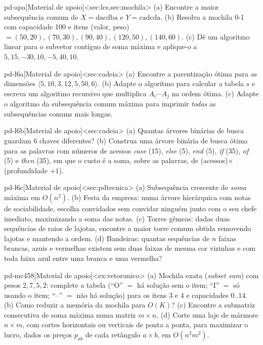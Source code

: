 \begin{exercicio}{pd-apa}[Material de apoio]<sec:lcs,sec:mochila>
(a) Encontre a maior subsequência comum de $X=\mathrm{dacdba}$ e $Y=\mathrm{cadcda}$. (b) Resolva a mochila 0-1 com capacidade 100 e itens (valor, peso) $=(50,20),(70,30),(90,40),(120,50),(140,60)$. (c) Dê um algoritmo linear para o subvetor contíguo de soma máxima e aplique-o a $5,15,-30,10,-5,40,10$.
\end{exercicio}
\begin{exercicio}{pd-l6a}[Material de apoio]<sec:cadeia>
(a) Encontre a parentização ótima para as dimensões $\langle5,10,3,12,5,50,6\rangle$. (b) Adapte o algoritmo para calcular a tabela $s$ e escreva um algoritmo recursivo que multiplica $A_i\cdots A_j$ na ordem ótima. (c) Adapte o algoritmo da subsequência comum máxima para imprimir \emph{todas} as subsequências comuns mais longas.
\end{exercicio}
\begin{exercicio}{pd-l6b}[Material de apoio]<sec:cadeia>
(a) Quantas árvores binárias de busca guardam 6 chaves diferentes? (b) Construa uma árvore binária de busca ótima para as palavras com números de acessos \emph{case} (15), \emph{else} (5), \emph{end} (5), \emph{if} (35), \emph{of} (5) e \emph{then} (35), em que o custo é a soma, sobre as palavras, de (acessos)$\times$(profundidade $+1$).
\end{exercicio}
\begin{exercicio}{pd-l6c}[Material de apoio]<sec:pdtecnica>
(a) Subsequência crescente de \emph{soma} máxima em $O(n^2)$. (b) Festa da empresa: numa árvore hierárquica com notas de sociabilidade, escolha convidados sem convidar ninguém junto com o seu chefe imediato, maximizando a soma das notas. (c) Torres gêmeas: dadas duas sequências de raios de lajotas, encontre a maior torre comum obtida removendo lajotas e mantendo a ordem. (d) Bandeiras: quantas sequências de $n$ faixas brancas, azuis e vermelhas existem sem duas faixas de mesma cor vizinhas e com toda faixa azul entre uma branca e uma vermelha?
\end{exercicio}
\begin{exercicio}{pd-mc458}[Material de apoio]<ex:vetorunico>
(a) Mochila exata (\emph{subset sum}) com pesos $2,7,5,2$: complete a tabela (``O'' $=$ há solução sem o item; ``I'' $=$ só usando o item; ``--'' $=$ não há solução) para os itens 3 e 4 e capacidades $0..14$. (b) Como reduzir a memória da mochila para $O(K)$? (c) Encontre a submatriz consecutiva de soma máxima numa matriz $m\times n$. (d) Corte uma laje de mármore $n\times m$, com cortes horizontais ou verticais de ponta a ponta, para maximizar o lucro, dados os preços $p_{ab}$ de cada retângulo $a\times b$, em $O(n^2m^2)$.
\end{exercicio}

